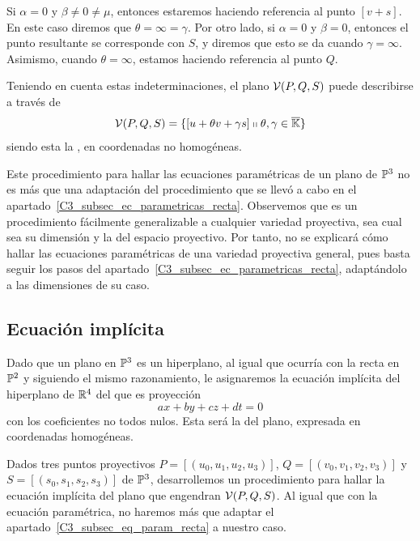 Si $\alpha=0$ y $\beta\not=0\not=\mu$, entonces estaremos haciendo referencia al punto $[v+s]$. En este caso diremos que $\theta=\infty=\gamma$. Por otro lado, si $\alpha=0$ y $\beta=0$, entonces el punto resultante se corresponde con $S$, y diremos que esto se da cuando $\gamma=\infty$. Asimismo, cuando $\theta=\infty$, estamos haciendo referencia al punto $Q$.

Teniendo en cuenta estas indeterminaciones, el plano $\mathcal{V}(P,Q,S)$ puede describirse a través de
\begin{equation}
\label{C3_eq_descripcionPlanoP1}
\mathcal{V}(P,Q,S)=\{\left [ u+\theta v+\gamma s \right ]\shortparallel \theta,\gamma\in\overline{\mathbb{K}}\}
\end{equation}
siendo esta la , en coordenadas no homogéneas.

\begin{obs}
	Este procedimiento para hallar las ecuaciones paramétricas de un plano de $\mathbb{P}^3$ no es más que una adaptación del procedimiento que se llevó a cabo en el apartado~\ref{C3_subsec_ec_parametricas_recta}. Observemos que es un procedimiento fácilmente generalizable a cualquier variedad proyectiva, sea cual sea su dimensión y la del espacio proyectivo. Por tanto, no se explicará cómo hallar las ecuaciones paramétricas de una variedad proyectiva general, pues basta seguir los pasos del apartado~\ref{C3_subsec_ec_parametricas_recta}, adaptándolo a las dimensiones de su caso.
\end{obs}

\subsection{Ecuación implícita}

Dado que un plano en $\mathbb{P}^3$ es un hiperplano, al igual que ocurría con la recta en $\mathbb{P}^2$ y siguiendo el mismo razonamiento, le asignaremos la ecuación implícita del hiperplano de $\mathbb{R}^4$ del que es proyección
\begin{equation}
\label{C3_eq_implicita_plano}
ax+by+cz+dt=0
\end{equation}
con los coeficientes no todos nulos. Esta será la  del plano, expresada en coordenadas homogéneas. 

Dados tres puntos proyectivos $P=[(u_0,u_1,u_2,u_3)]$, $Q=[(v_0,v_1,v_2,v_3)]$ y $S=[(s_0,s_1,s_2,s_3)]$ de $\mathbb{P}^3$, desarrollemos un procedimiento para hallar la ecuación implícita del plano que engendran $\mathcal{V}(P,Q,S)$. Al igual que con la ecuación paramétrica, no haremos más que adaptar el apartado~\ref{C3_subsec_eq_param_recta} a nuestro caso.

